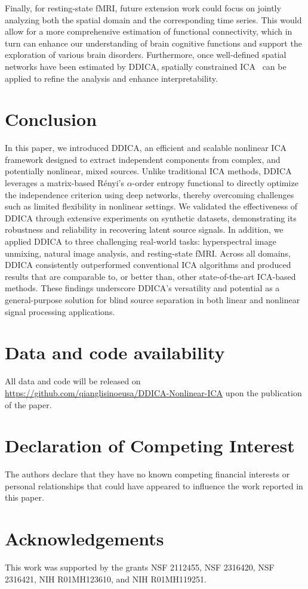 \documentclass{article}
\begin{document}
Finally, for resting-state fMRI, future extension work could focus on jointly analyzing both the spatial domain and the corresponding time series. This would allow for a more comprehensive estimation of functional connectivity, which in turn can enhance our understanding of brain cognitive functions and support the exploration of various brain disorders. Furthermore, once well-defined spatial networks have been estimated by DDICA, spatially constrained ICA~\cite{Yuhui20} can be applied to refine the analysis and enhance interpretability.

\section{Conclusion}
\hspace{1.2em} In this paper, we introduced DDICA, an efficient and scalable nonlinear ICA framework designed to extract independent components from complex, and potentially nonlinear, mixed sources. Unlike traditional ICA methods, DDICA leverages a matrix-based Rényi’s $\alpha$-order entropy functional to directly optimize the independence criterion using deep networks, thereby overcoming challenges such as limited flexibility in nonlinear settings. We validated the effectiveness of DDICA through extensive experiments on synthetic datasets, demonstrating its robustness and reliability in recovering latent source signals. In addition, we applied DDICA to three challenging real-world tasks: hyperspectral image unmixing, natural image analysis, and resting-state fMRI. Across all domains, DDICA consistently outperformed conventional ICA algorithms and produced results that are comparable to, or better than, other state-of-the-art ICA-based methods. These findings underscore DDICA's versatility and potential as a general-purpose solution for blind source separation in both linear and nonlinear signal processing applications. 

\section{Data and code availability}
All data and code will be released on \url{https://github.com/qianglisinoeusa/DDICA-Nonlinear-ICA} upon the publication of the paper.

\section{Declaration of Competing Interest}
\hspace{1.2em} The authors declare that they have no known competing financial interests or personal relationships that could have appeared to influence the work reported in this paper.

\section{Acknowledgements}
\hspace{1.2em} This work was supported by the grants NSF 2112455, NSF 2316420, NSF 2316421, NIH R01MH123610, and NIH R01MH119251.

 
\end{document}
